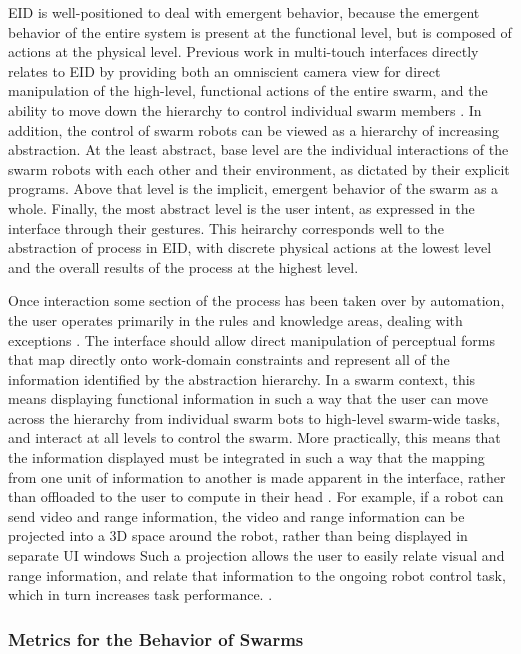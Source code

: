 \documentclass[]{article}
\begin{document}
EID is well-positioned to deal with emergent behavior, because the emergent behavior of the entire system is present at the functional level, but is composed of actions at the physical level.  
Previous work in multi-touch interfaces directly relates to EID by providing both an omniscient camera view for direct manipulation of the high-level, functional actions of the entire swarm, and the ability to move down the hierarchy to control individual swarm members \cite{Micire:2009:ANG:1731903.1731912}.
In addition, the control of swarm robots can be viewed as a hierarchy of increasing abstraction. 
At the least abstract, base level are the individual interactions of the swarm robots with each other and their environment, as dictated by their explicit programs. 
Above that level is the implicit, emergent behavior of the swarm as a whole. 
Finally, the most abstract level is the user intent, as expressed in the interface through their gestures. 
This heirarchy corresponds well to the abstraction of process in EID, with discrete physical actions at the lowest level and the overall results of the process at the highest level. 

Once interaction some section of the process has been taken over by automation, the user operates primarily in the rules and knowledge areas, dealing with exceptions \cite{vicente2002ecological}.
The interface should allow direct manipulation of perceptual forms that map directly onto work-domain constraints and represent all of the information identified by the abstraction hierarchy. 
In a swarm context, this means displaying functional information in such a way that the user can move across the hierarchy from individual swarm bots to high-level swarm-wide tasks, and interact at all levels to control the swarm. 
More practically, this means that the information displayed must be integrated in such a way that the mapping from one unit of information to another is made apparent in the interface, rather than offloaded to the user to compute in their head \cite{yanco2004beyond}. 
For example, if a robot can send video and range information, the video and range information can be projected into a 3D space around the robot, rather than being displayed in separate UI windows 
Such a projection allows the user to easily relate visual and range information, and relate that information to the ongoing robot control task, which in turn increases task performance\cite{ricks2004ecological}. . 


\subsubsection{Metrics for the Behavior of Swarms}
\end{document}
